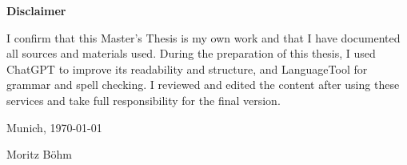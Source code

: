 \cleardoublepage{}
\thispagestyle{empty}

\vspace*{20mm}
\noindent

\makeatletter

\begin{center}
    {\textbf{Disclaimer}}
\end{center}

\begin{flushleft}
    {I confirm that this Master’s Thesis is my own work and that I have documented all sources and materials used.
    During the preparation of this thesis, I used ChatGPT to improve its readability and structure, and LanguageTool for grammar and spell checking.
    I reviewed and edited the content after using these services and take full responsibility for the final version.}


    

    \makeatother

    \vspace{15mm}
    \noindent

    Munich, \today{}

    Moritz Böhm
\end{flushleft}

\cleardoublepage{}
